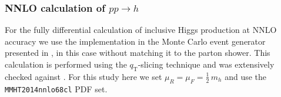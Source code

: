 \subsubsection{NNLO calculation of $pp\to h$}
\label{sec:hjetscomp:tools:fo:sherpa}

For the fully differential calculation of inclusive Higgs production 
at NNLO accuracy we use the implementation in the \Sherpa Monte Carlo 
event generator presented in \cite{Gleisberg:2008ta,Hoche:2014dla}, in 
this case without matching it to the parton shower. This calculation is 
performed using the $q_\text{T}$-slicing technique and was extensively 
checked against \HNNLO \cite{Catani:2007vq}. For this study here we set 
$\mu_R=\mu_F=\tfrac{1}{2}\,m_h$ and use the \texttt{MMHT2014nnlo68cl} 
PDF set. 

